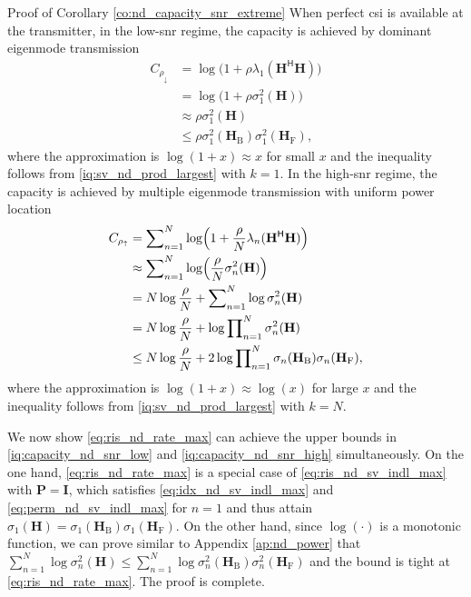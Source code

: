 \documentclass[journal]{IEEEtran}
\begin{document}
\begin{appendix}
	\begin{subsection}{Proof of Corollary \ref{co:nd_capacity_snr_extreme}}
		\label{ap:nd_capacity}
		When perfect \gls{csi} is available at the transmitter, in the low-\gls{snr} regime, the capacity is achieved by dominant eigenmode transmission \cite[(5.26)]{Clerckx2013}
		\begin{align*}
			C_{\rho_\downarrow}
			& = \log\bigl(1 + \rho \lambda_1(\mathbf{H}^\mathsf{H} \mathbf{H})\bigr)        \\
			& = \log\bigl(1 + \rho \sigma_1^2(\mathbf{H})\bigr)                             \\
			& \approx \rho \sigma_1^2(\mathbf{H})                                           \\
			& \le \rho \sigma_1^2(\mathbf{H}_\mathrm{B}) \sigma_1^2(\mathbf{H}_\mathrm{F}),
		\end{align*}
		where the approximation is $\log(1 + x) \approx x$ for small $x$ and the inequality follows from \eqref{iq:sv_nd_prod_largest} with $k=1$.
		In the high-\gls{snr} regime, the capacity is achieved by multiple eigenmode transmission with uniform power location \cite[(5.27)]{Clerckx2013}
		\begin{align*}
			C_{\rho_\uparrow}
			& = \sum\nolimits_{n=1}^N \log\Bigl(1 + \frac{\rho}{N} \lambda_n(\mathbf{H}^\mathsf{H} \mathbf{H})\Bigr)                     \\
			& \approx \sum\nolimits_{n=1}^N \log\Bigl(\frac{\rho}{N} \sigma_n^2(\mathbf{H})\Bigr)                                        \\
			& = N \log \frac{\rho}{N} + \sum\nolimits_{n=1}^N \log \sigma_n^2(\mathbf{H})                                                \\
			& = N \log \frac{\rho}{N} + \log \prod\nolimits_{n=1}^N \sigma_n^2(\mathbf{H})                                               \\
			& \le N \log \frac{\rho}{N} + 2 \log \prod\nolimits_{n=1}^N \sigma_n(\mathbf{H}_\mathrm{B}) \sigma_n(\mathbf{H}_\mathrm{F}),
		\end{align*}
		where the approximation is $\log(1 + x) \approx \log(x)$ for large $x$ and the inequality follows from \eqref{iq:sv_nd_prod_largest} with $k=N$.

		We now show \eqref{eq:ris_nd_rate_max} can achieve the upper bounds in \eqref{iq:capacity_nd_snr_low} and \eqref{iq:capacity_nd_snr_high} simultaneously.
		On the one hand, \eqref{eq:ris_nd_rate_max} is a special case of \eqref{eq:ris_nd_sv_indl_max} with $\mathbf{P} = \mathbf{I}$, which satisfies \eqref{eq:idx_nd_sv_indl_max} and \eqref{eq:perm_nd_sv_indl_max} for $n=1$ and thus attain $\sigma_1(\mathbf{H}) = \sigma_1(\mathbf{H}_\mathrm{B}) \sigma_1(\mathbf{H}_\mathrm{F})$.
		On the other hand, since $\log(\cdot)$ is a monotonic function, we can prove similar to Appendix \ref{ap:nd_power} that $\sum_{n=1}^N \log \sigma_n^2(\mathbf{H}) \le \sum_{n=1}^N \log \sigma_n^2(\mathbf{H}_\mathrm{B}) \sigma_n^2(\mathbf{H}_\mathrm{F})$ and the bound is tight at \eqref{eq:ris_nd_rate_max}.
		The proof is complete.
	\end{subsection}


\end{appendix}
\end{document}

